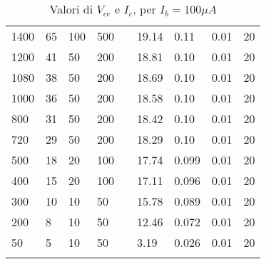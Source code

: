 \begin{longtable}[c]{|l|l|l|l|l|l|l|l|l|}
    1400          & 65                        & 100                       & 500                        &  & 19.14      & 0.11                      & 0.01                       & 20                         \\ \cline{1-4} \cline{6-9}
    1200          & 41                        & 50                        & 200                        &  & 18.81      & 0.10                     & 0.01                       & 20                         \\ \cline{1-4} \cline{6-9}
    1080          & 38                        & 50                        & 200                        &  & 18.69      & 0.10                      & 0.01                       & 20                         \\ \cline{1-4} \cline{6-9}
    1000          & 36                        & 50                        & 200                        &  & 18.58      & 0.10                      & 0.01                       & 20                         \\ \cline{1-4} \cline{6-9}
    800           & 31                        & 50                        & 200                        &  & 18.42      & 0.10                      & 0.01                       & 20                         \\ \cline{1-4} \cline{6-9}
    720           & 29                        & 50                        & 200                        &  & 18.29      & 0.10                      & 0.01                       & 20                         \\ \cline{1-4} \cline{6-9}
    500           & 18                        & 20                        & 100                        &  & 17.74      & 0.099                      & 0.01                       & 20                         \\ \cline{1-4} \cline{6-9}
    400           & 15                        & 20                        & 100                        &  & 17.11      & 0.096                      & 0.01                       & 20                         \\ \cline{1-4} \cline{6-9}
    300           & 10                        & 10                        & 50                         &  & 15.78      & 0.089                      & 0.01                       & 20                         \\ \cline{1-4} \cline{6-9}
    200           & 8                         & 10                        & 50                         &  & 12.46      & 0.072                      & 0.01                       & 20                         \\ \cline{1-4} \cline{6-9}
    50            & 5                         & 10                        & 50                         &  & 3.19       & 0.026                      & 0.01                       & 20                         \\ \cline{1-4} \cline{6-9}
    
    \caption{\label{tab:Tabella2}{Valori di $V_{ce}$ e $I_c$, per $I_b=100\mu A$}}                                                                                                                            \\
\end{longtable}

